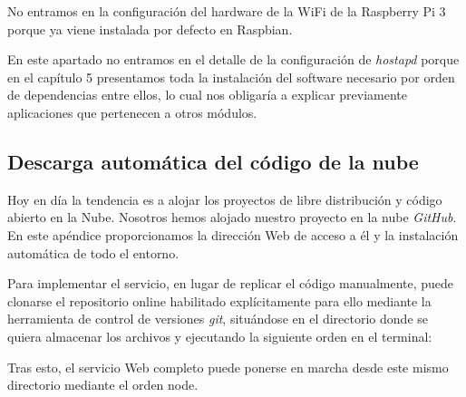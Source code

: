 \begin{appendices}
No entramos en la configuración del hardware de la WiFi de la Raspberry Pi 3 porque ya viene instalada por defecto en Raspbian.

En este apartado no entramos en el detalle de la configuración de \emph{hostapd} porque en el capítulo 5 presentamos toda la instalación del software necesario por orden de dependencias entre ellos, lo cual nos obligaría a explicar previamente aplicaciones que pertenecen a otros módulos.
\cleardoublepage
{}%
\begin{center}
\begin{minipage}{.75\textwidth}
\section{Descarga automática del código de la nube}\label{ApendiceB}

Hoy en día la tendencia es a alojar los proyectos de libre distribución y código abierto en la Nube. Nosotros hemos alojado nuestro proyecto en la nube \emph{GitHub}. En este apéndice proporcionamos la dirección Web de acceso a él y la instalación automática de todo el entorno.
\end{minipage}
\end{center}
\clearpage%

Para implementar el servicio, en lugar de replicar el código manualmente, puede clonarse el repositorio online habilitado explícitamente para ello mediante la herramienta de control de versiones \emph{git}, situándose en el directorio donde se quiera almacenar los archivos y ejecutando la siguiente orden en el terminal: 


Tras esto, el servicio Web completo puede ponerse en marcha desde este mismo directorio mediante el orden node.


\end{appendices}

